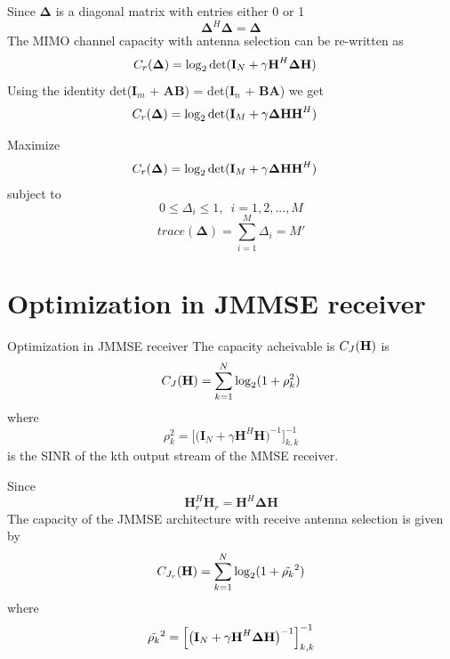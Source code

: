 \documentclass{beamer}
\begin{document}
\begin{frame}{}
Since $\mathbf{\Delta}$ is a diagonal matrix with entries either 0 or 1\\
$$\mathbf{\Delta}^H\mathbf{\Delta}=\mathbf{\Delta}$$
The MIMO channel capacity with antenna selection can be re-written as
\begin{align*}
\mathnormal{C}_r(\mathbf{\Delta}) &=\log_{2}\text{det}(\mathbf{I}_N + \gamma\textbf{H}^H\mathbf{\Delta}\textbf{H})
\end{align*}
Using the identity det(\textbf{I$_m$} + \textbf{A}\textbf{B}) = det(\textbf{I}$_n$ + \textbf{B}\textbf{A}) we get
\begin{align*}
\mathnormal{C}_r(\mathbf{\Delta}) &=\log_{2}\text{det}(\mathbf{I}_M + \gamma\mathbf{\Delta}\textbf{H}\textbf{H}^H)
\end{align*}
\end{frame}

\begin{frame}{}
Maximize 
\begin{align*}
\mathnormal{C}_r(\mathbf{\Delta}) &=\log_{2}\text{det}(\mathbf{I}_M + \gamma\mathbf{\Delta}\textbf{H}\textbf{H}^H)
\end{align*}
subject to
$$0\leq\Delta_{i}\leq1,\enspace i=1,2,...,M$$
$$trace(\mathbf{\Delta})=\sum_{i=1}^{M} \Delta_i = M'$$
\end{frame}
 
 \section{Optimization in JMMSE receiver}
\begin{frame}{Optimization in JMMSE receiver}
The capacity acheivable is $\mathnormal{C}_{\mathnormal{J}}(\mathbf{H})$ is
$$\mathnormal{C}_{\mathnormal{J}}(\mathbf{H}) = \sum_{k=1}^{N} \log_{2}(1 + \rho_{k}^2)$$
where 
$$\rho_{k}^2 = \Big[\big(\mathbf{I}_N + \gamma\textbf{H}^H\textbf{H}\big)^{-1}\Big]_{k,k}^{-1}$$
is the SINR of the kth output stream of the MMSE receiver.\\
\end{frame}

\begin{frame}{}
Since $$\mathbf{H}_r^H\mathbf{H}_r = \mathbf{H}^H\mathbf{\Delta}\mathbf{H}$$
The capacity of the JMMSE architecture with receive antenna selection is given by
$$\mathnormal{C}_{\mathnormal{J_r}}(\mathbf{H}) = \sum_{k=1}^{N} \log_{2}(1 + \Tilde{\rho_{k}}^2)$$
where
$$\Tilde{\rho_{k}}^2 = \Big[\big(\mathbf{I}_N + \gamma\textbf{H}^H\mathbf{\Delta}\textbf{H}\big)^{-1}\Big]_{k,k}^{-1}$$
\end{frame}
\end{document}
